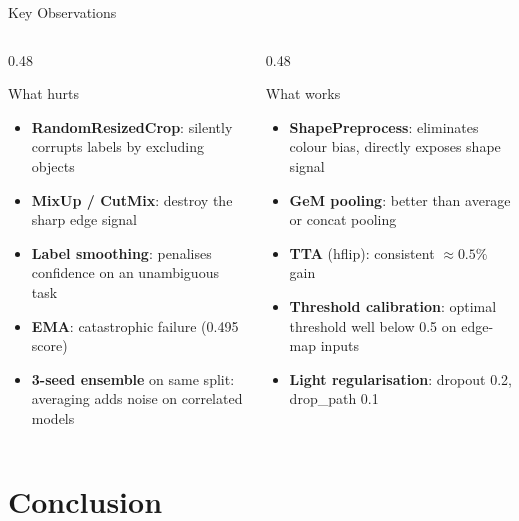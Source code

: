 \documentclass[aspectratio=169]{beamer}
\begin{document}
\begin{frame}[t]{Key Observations}
  \begin{columns}[T]
    \begin{column}{0.48\textwidth}
      \begin{alertblock}{What hurts}
        \footnotesize
        \begin{itemize}
          \item \textbf{RandomResizedCrop}: silently corrupts labels by excluding objects
          \item \textbf{MixUp / CutMix}: destroy the sharp edge signal
          \item \textbf{Label smoothing}: penalises confidence on an unambiguous task
          \item \textbf{EMA}: catastrophic failure (0.495 score)
          \item \textbf{3-seed ensemble} on same split: averaging adds noise on correlated models
        \end{itemize}
      \end{alertblock}
    \end{column}
    \begin{column}{0.48\textwidth}
      \begin{block}{What works}
        \footnotesize
        \begin{itemize}
          \item \textbf{ShapePreprocess}: eliminates colour bias, directly exposes shape signal
          \item \textbf{GeM pooling}: better than average or concat pooling
          \item \textbf{TTA} (hflip): consistent $\approx\!0.5\%$ gain
          \item \textbf{Threshold calibration}: optimal threshold well below 0.5 on edge-map inputs
          \item \textbf{Light regularisation}: dropout 0.2, drop\_path 0.1
        \end{itemize}
      \end{block}
    \end{column}
  \end{columns}
\end{frame}

\section{Conclusion}
\end{document}
